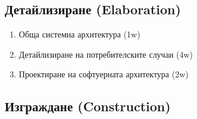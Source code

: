 \documentclass[a4paper]{article}
\begin{document}
\subsection{Детайлизиране (Elaboration)} %
\begin{enumerate}
\item Обща системна архитектура (1w)
\item Детайлизиране на потребителските случаи (4w)
\item Проектиране на софтуерната архитектура (2w)
\end{enumerate}

\subsection{Изграждане (Construction)} %
\end{document}
